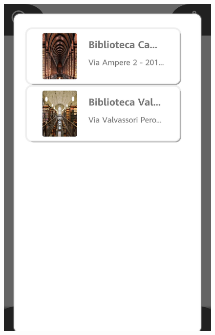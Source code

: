 \begin{figure}[H]
	\hspace{0.5cm}
	\includegraphics[scale=0.15]{Images/UI/Libraries/2}
	\hspace{0.5cm}

\end{figure}
